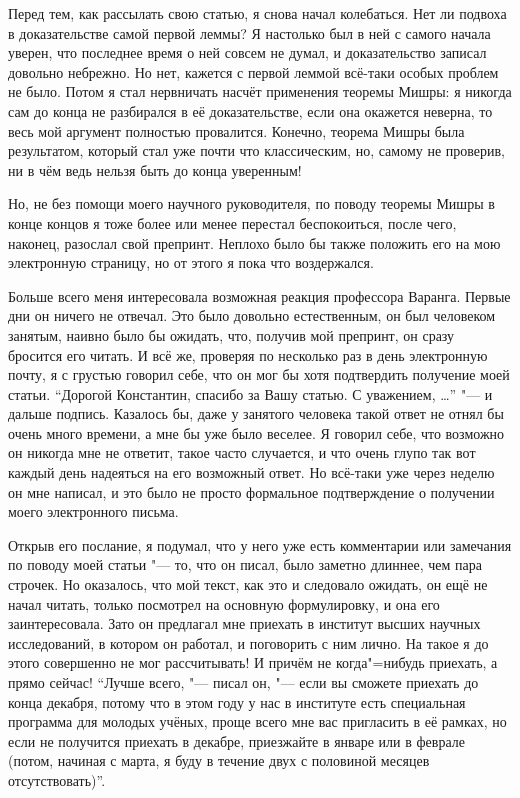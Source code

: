 Перед тем, как рассылать свою статью, я снова начал колебаться.
Нет ли подвоха в доказательстве самой первой леммы?
Я настолько был в ней с самого начала уверен, что последнее время о ней совсем
не думал, и доказательство записал довольно небрежно.
Но нет, кажется с первой леммой всё-таки особых проблем не было.
Потом я стал нервничать насчёт применения теоремы Мишры:
я никогда сам до конца не разбирался в её доказательстве, если она окажется
неверна, то весь мой аргумент полностью провалится.
Конечно, теорема Мишры была результатом, который стал уже почти что классическим,
но, самому не проверив, ни в чём ведь нельзя быть до конца уверенным!

Но, не без помощи моего научного руководителя, по поводу теоремы Мишры в конце
концов я тоже более или менее перестал беспокоиться, после чего, наконец,
разослал свой препринт.
Неплохо было бы также положить его на мою электронную страницу, но от этого я
пока что воздержался.

Больше всего меня интересовала возможная реакция профессора Варанга.
Первые дни он ничего не отвечал.
Это было довольно естественным, он был человеком занятым, наивно было бы ожидать,
что, получив мой препринт, он сразу бросится его читать.
И всё же, проверяя по несколько раз в день электронную почту, я с грустью
говорил себе, что он мог бы хотя подтвердить получение моей статьи.
\enquote{Дорогой Константин, спасибо за Вашу статью.
С уважением, \ldots} "--- и дальше подпись.
Казалось бы, даже у занятого человека такой ответ не отнял бы очень много
времени, а мне бы уже было веселее.
Я говорил себе, что возможно он никогда мне не ответит, такое часто случается,
и что очень глупо так вот каждый день надеяться на его возможный ответ.
Но всё-таки уже через неделю он мне написал, и это было не просто формальное
подтверждение о получении моего электронного письма.

Открыв его послание, я подумал, что у него уже есть комментарии или замечания по
поводу моей статьи "--- то, что он писал, было заметно длиннее, чем пара
строчек.
Но оказалось, что мой текст, как это и следовало ожидать, он ещё не начал читать,
только посмотрел на основную формулировку, и она его заинтересовала.
Зато он предлагал мне приехать в институт высших научных исследований, в котором
он работал, и поговорить с ним лично.
На такое я до этого совершенно не мог рассчитывать!
И причём не когда"=нибудь приехать, а прямо сейчас!
\enquote{Лучше всего, "--- писал он, "--- если вы сможете приехать до конца
декабря, потому что в этом году у нас в институте есть специальная программа для
молодых учёных, проще всего мне вас пригласить в её рамках, но если не получится
приехать в декабре, приезжайте в январе или в феврале (потом, начиная с марта,
я буду в течение двух с половиной месяцев отсутствовать)}.

